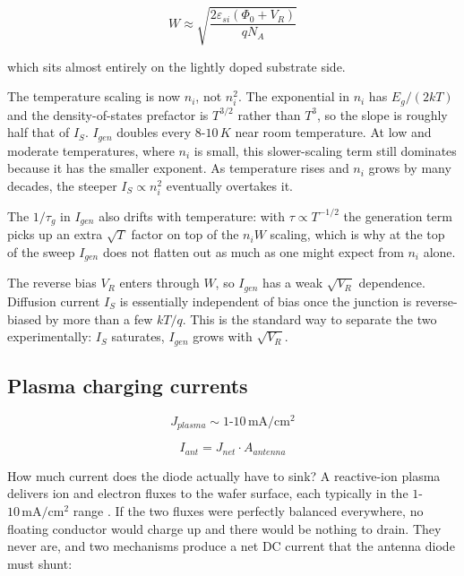 \[ W \approx \sqrt{\frac{2 \varepsilon_{si} (\Phi_0 + V_R)}{q N_A}} \]

which sits almost entirely on the lightly doped substrate side.

The temperature scaling is now \(n_i\), not \(n_i^2\). The exponential
in \(n_i\) has \(E_g/(2kT)\) and the density-of-states prefactor is
\(T^{3/2}\) rather than \(T^3\), so the slope is roughly half that of
\(I_S\). \(I_{gen}\) doubles every \(8\)-\(10\, K\) near room
temperature. At low and moderate temperatures, where \(n_i\) is small,
this slower-scaling term still dominates because it has the smaller
exponent. As temperature rises and \(n_i\) grows by many decades, the
steeper \(I_S \propto n_i^2\) eventually overtakes it.

The \(1/\tau_g\) in \(I_{gen}\) also drifts with temperature: with
\(\tau \propto T^{-1/2}\) the generation term picks up an extra
\(\sqrt{T}\) factor on top of the \(n_i W\) scaling, which is why at the
top of the sweep \(I_{gen}\) does not flatten out as much as one might
expect from \(n_i\) alone.

The reverse bias \(V_R\) enters through \(W\), so \(I_{gen}\) has a weak
\(\sqrt{V_R}\) dependence. Diffusion current \(I_S\) is essentially
independent of bias once the junction is reverse-biased by more than a
few \(kT/q\). This is the standard way to separate the two
experimentally: \(I_S\) saturates, \(I_{gen}\) grows with
\(\sqrt{V_R}\).

\subsection{Plasma charging currents}\label{plasma-charging-currents}

\[ J_{plasma} \sim 1\text{-}10\, \mathrm{mA/cm^2} \]

\[ I_{ant} = J_{net} \cdot A_{antenna} \]

How much current does the diode actually have to sink? A reactive-ion
plasma delivers ion and electron fluxes to the wafer surface, each
typically in the \(1\)-\(10\, \mathrm{mA/cm^2}\) range
. If the two fluxes were perfectly
balanced everywhere, no floating conductor would charge up and there
would be nothing to drain. They never are, and two mechanisms produce a
net DC current that the antenna diode must shunt:


